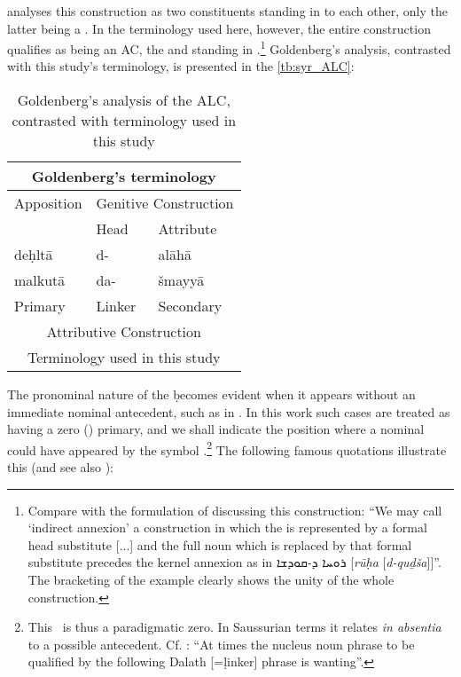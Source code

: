 {{ \citet{GoldenbergAttribution} analyses this construction as two constituents standing in  to each other, only the latter being a . In the terminology used here, however, the entire construction qualifies as being an AC, the \prim and \secn standing in .\footnote{Compare with the  formulation of \citet[79]{GoldenbergEarly} discussing this construction: \enquote{We may call \enquote{indirect annexion} a construction in which the  is represented by a formal head substitute [...] and the full noun which is replaced by that formal substitute precedes the kernel annexion as in \textsyriac{ܪܘܚܐ ܕ-ܩܘܕܫܐ} [\textit{rūḥa} [\textit{d-quḏša}]]}. The bracketing of the example clearly shows the unity of the whole construction.} Goldenberg's analysis, contrasted with this study's terminology, is presented in the \vref{tb:syr_ALC}:
 
 \begin{table}[h!]
 \centering
 \begin{tabular}{l l l}
 \toprule
 \multicolumn{3}{c}{Goldenberg's terminology} \\
 \midrule
 Apposition 	& \multicolumn{2}{|c}{{\small Genitive Construction}} \\
				& \multicolumn{1}{|l}{\hspace{0.1in}Head} & Attribute \\
 \midrule	
 deḥltā		&	d- & alāhā \\
 malkutā		& 	da- & šmayyā \\
 \midrule
 Primary	& Linker & Secondary \\
 \multicolumn{3}{c}{Attributive Construction} \\
 \midrule
 \multicolumn{3}{c}{Terminology used in this study} \\
 \bottomrule
 \end{tabular}
 \caption{Goldenberg's analysis of the ALC, contrasted with terminology used in this study} \label{tb:syr_ALC}
 \end{table}
 

 The pronominal nature of the \lnk* \d becomes evident when it appears without an immediate nominal antecedent, such as in . In this work such cases are treated as having a zero (\zero) primary,  and we shall indicate the position where a nominal \prim could have appeared by the symbol \zero.\footnote{This \zero\ is thus a paradigmatic zero. In Saussurian terms it relates \textit{in absentia} to a possible antecedent. Cf. \citet[70]{MuraokaSyriac}: \enquote{At times the nucleus noun phrase to be qualified by the following Dalath [=\d linker] phrase is wanting}.} The following famous quotations illustrate this (and see also ):
 
}}
